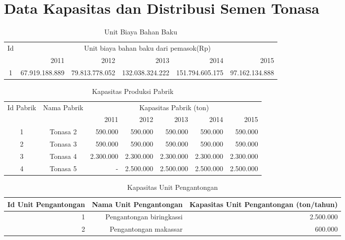 \documentclass{article}
\begin{document}
	\section*{Data Kapasitas dan Distribusi Semen Tonasa}
	\begin{table}[h]
		\caption{Unit Biaya Bahan Baku}
		\begin{tabular}{|c|r|r|r|r|r|}
			\hline
			\multicolumn{ 1}{|c|}{Id} &   \multicolumn{ 5}{|c|}{Unit biaya bahan baku dari pemasok(Rp)} \\

			\multicolumn{ 1}{|c|}{} &       2011 &       2012 &       2013 &       2014 &       2015 \\
			\hline
			1 & 67.919.188.889 & 79.813.778.052 & 132.038.324.222 & 151.794.605.175 & 97.162.134.888 \\
			\hline
		\end{tabular}
	\end{table}  
	\begin{table}[h]
		\caption{Kapasitas Produksi Pabrik}
		\begin{tabular}{|c|c|rrrrr|}
			\hline
			\multicolumn{ 1}{|c|}{Id Pabrik} & \multicolumn{ 1}{|c|}{Nama Pabrik} &                   \multicolumn{ 5}{|c}{Kapasitas Pabrik (ton)} \\
			
			\multicolumn{ 1}{|c|}{} & \multicolumn{ 1}{|c|}{} &       2011 &       2012 &       2013 &       2014 &       2015 \\
			\hline
			1 &   Tonasa 2 &    590.000 &    590.000 &    590.000 &    590.000 &    590.000 \\
			\hline
			2 &   Tonasa 3 &    590.000 &    590.000 &    590.000 &    590.000 &    590.000 \\
			\hline
			3 &   Tonasa 4 &  2.300.000 &  2.300.000 &  2.300.000 &  2.300.000 &  2.300.000 \\
			\hline
			4 &   Tonasa 5 &          - &  2.500.000 &  2.500.000 &  2.500.000 &  2.500.000 \\
			\hline
		\end{tabular}  
	\end{table}
\begin{table}[h]
	\caption{Kapasitas Unit Pengantongan}
	\begin{tabular}{|r|r|r|}
		\hline
		Id Unit Pengantongan & Nama Unit Pengantongan & Kapasitas Unit Pengantongan (ton/tahun) \\
		\hline
		1 & Pengantongan biringkassi &  2.500.000 \\
		\hline
		2 & Pengantongan makassar &    600.000 \\
		\hline
	\end{tabular}  
\end{table}
\end{document}
